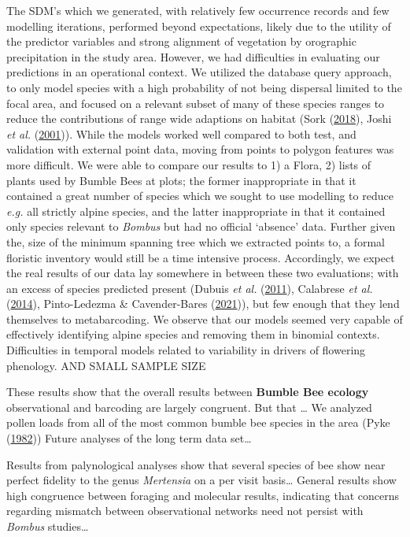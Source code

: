 \documentclass[
]{article}
\begin{document}
The SDM's which we generated, with relatively few occurrence records and
few modelling iterations, performed beyond expectations, likely due to
the utility of the predictor variables and strong alignment of
vegetation by orographic precipitation in the study area. However, we
had difficulties in evaluating our predictions in an operational
context. We utilized the database query approach, to only model species
with a high probability of not being dispersal limited to the focal
area, and focused on a relevant subset of many of these species ranges
to reduce the contributions of range wide adaptions on habitat (Sork
(\protect\hyperlink{ref-sork2018genomic}{2018}), Joshi \emph{et al.}
(\protect\hyperlink{ref-joshi2001local}{2001})). While the models worked
well compared to both test, and validation with external point data,
moving from points to polygon features was more difficult. We were able
to compare our results to 1) a Flora, 2) lists of plants used by Bumble
Bees at plots; the former inappropriate in that it contained a great
number of species which we sought to use modelling to reduce \emph{e.g.}
all strictly alpine species, and the latter inappropriate in that it
contained only species relevant to \emph{Bombus} but had no official
`absence' data. Further given the, size of the minimum spanning tree
which we extracted points to, a formal floristic inventory would still
be a time intensive process. Accordingly, we expect the real results of
our data lay somewhere in between these two evaluations; with an excess
of species predicted present (Dubuis \emph{et al.}
(\protect\hyperlink{ref-dubuis2011predicting}{2011}), Calabrese \emph{et
al.} (\protect\hyperlink{ref-calabrese2014stacking}{2014}),
Pinto-Ledezma \& Cavender-Bares
(\protect\hyperlink{ref-pinto2021predicting}{2021})), but few enough
that they lend themselves to metabarcoding. We observe that our models
seemed very capable of effectively identifying alpine species and
removing them in binomial contexts. Difficulties in temporal models
related to variability in drivers of flowering phenology. AND SMALL
SAMPLE SIZE

These results show that the overall results between \textbf{Bumble Bee
ecology} observational and barcoding are largely congruent. But that
\ldots{} We analyzed pollen loads from all of the most common bumble bee
species in the area (Pyke (\protect\hyperlink{ref-pyke1982local}{1982}))
Future analyses of the long term data set\ldots{}

Results from palynological analyses show that several species of bee
show near perfect fidelity to the genus \emph{Mertensia} on a per visit
basis\ldots{} General results show high congruence between foraging and
molecular results, indicating that concerns regarding mismatch between
observational networks need not persist with \emph{Bombus}
studies\ldots{}
\end{document}
